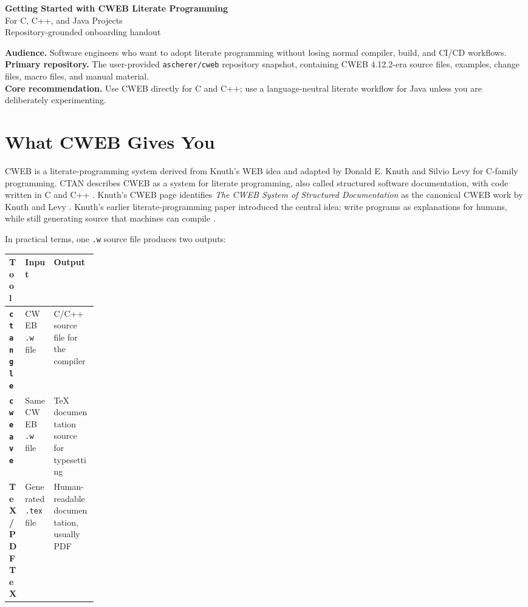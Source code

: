 \documentclass[11pt]{article}
\begin{document}
\begin{center}
  {\LARGE\bfseries\color{Navy} Getting Started with CWEB Literate Programming}\\[0.25em]
  {\large For C, C++, and Java Projects}\\[0.4em]
  {\normalsize Repository-grounded onboarding handout}\par
\end{center}

\vspace{0.5em}

\noindent\textbf{Audience.} Software engineers who want to adopt literate programming without losing normal compiler, build, and CI/CD workflows.\\
\textbf{Primary repository.} The user-provided \texttt{ascherer/cweb} repository snapshot, containing CWEB 4.12.2-era source files, examples, change files, macro files, and manual material.\\
\textbf{Core recommendation.} Use CWEB directly for C and C++; use a language-neutral literate workflow for Java unless you are deliberately experimenting.


\section{What CWEB Gives You}

CWEB is a literate-programming system derived from Knuth's WEB idea and adapted by Donald E. Knuth and Silvio Levy for C-family programming. CTAN describes CWEB as a system for literate programming, also called structured software documentation, with code written in C and C++ \cite{ctan-cweb}. Knuth's CWEB page identifies \emph{The CWEB System of Structured Documentation} as the canonical CWEB work by Knuth and Levy \cite{knuth-cweb}. Knuth's earlier literate-programming paper introduced the central idea: write programs as explanations for humans, while still generating source that machines can compile \cite{knuth-lp-paper,knuth-lp-page}.

In practical terms, one \texttt{.w} source file produces two outputs:

\begin{center}
\begin{tabularx}{0.96\linewidth}{>{\bfseries}p{0.17\linewidth} X X}
\toprule
Tool & Input & Output \\
\midrule
\texttt{ctangle} & CWEB \texttt{.w} file & C/C++ source file for the compiler \\
\texttt{cweave} & Same CWEB \texttt{.w} file & TeX documentation source for typesetting \\
TeX/PDFTeX & Generated \texttt{.tex} file & Human-readable documentation, usually PDF \\
\bottomrule
\end{tabularx}
\end{center}
\end{document}
